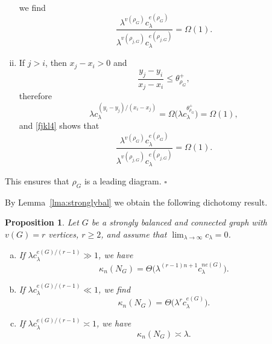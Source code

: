 \documentclass[12pt]{article}
\newtheorem{prop}{Proposition}[section]
\newenvironment{Proof}{\removelastskip\par\medskip
\noindent{\em Proof.} \rm}{\penalty-20\null\hfill$\square$\par\medbreak}
\numberwithin{equation}{section}
\begin{document}
\begin{Proof}
\begin{enumerate}[i)]
\begin{eqnarray}
\end{eqnarray} 
 we find 
\begin{equation}
  \nonumber
  \frac{\lambda^{v(\rho_G)}c_{\lambda}^{e(\rho_G)}}{\lambda^{v(\rho_{j,G})}c_{\lambda}^{e(\rho_{j,G})}}=\Omega(1).
\end{equation}
\item
   If $j>i$, then $x_{j}-x_{i}>0$ and
$$
\frac{y_{j}-y_{i}}{x_{j}-x_{i}}\le\theta_{\rho_{G}}^{+},
$$
 therefore
\begin{equation}
  \lambda c_{\lambda}^{ ( y_{i}-y_{j})/(x_{i}-x_{j})}=\Omega
 \big(\lambda c_\lambda^{ \theta^+_{\rho_G}}\big)=\Omega(1),
\end{equation}
and \eqref{fjkl4} shows that 
\begin{equation}
  \nonumber
  \frac{\lambda^{v(\rho_G)}c_{\lambda}^{e(\rho_G)}}{\lambda^{v(\rho_{j,G})}c_{\lambda}^{e(\rho_{j,G})}}=\Omega(1).
\end{equation}
  \end{enumerate}
  This ensures that $\rho_G$ is a leading diagram.
\end{Proof}
 By Lemma~\ref{lma:stronglybal} we obtain the following dichotomy result. 
\begin{prop}
   \label{dich1}
 Let $G$ be a strongly balanced and connected
 graph with $v(G)=r$ vertices, $r \geq 2$,
 and assume that $\lim_{\lambda \to \infty} c_\lambda =0$.
\begin{enumerate}[a)]
  \item If $\lambda c_\lambda^{e(G)/ ( r-1 )}\gg1$, we have
\begin{equation}
\label{r1} 
  \kappa_n(N_G)=\Theta\big(\lambda^{(r-1)n+1}c_\lambda^{ne(G)}\big). 
\end{equation}
\item If $\lambda c_\lambda^{e(G)/ ( r-1 )}\ll1$, we find 
\begin{equation}
\label{r2} 
  \kappa_n(N_G)=\Theta\big(\lambda^{r}c_\lambda^{e(G)}\big).
\end{equation}
\item If $\lambda c_\lambda^{e(G)/ ( r-1 )}\asymp 1$, we have
\begin{equation}
\label{r3} 
  \kappa_n(N_G)\asymp \lambda.  
\end{equation}
\end{enumerate} 
\end{prop} 
\end{document}
